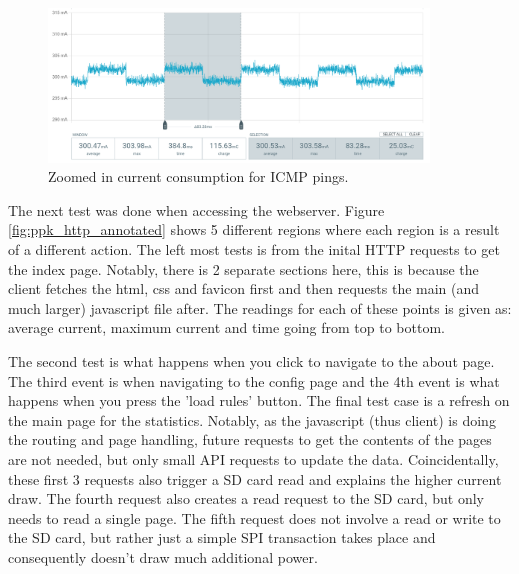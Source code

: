 \begin{figure}[h]
    \centering
    \includegraphics[width=0.9\textwidth]{Images/PPK_ping_zoom.png}
    \caption[Zoomed in current consumption for ICMP pings]{Zoomed in current consumption for ICMP pings.}
    \label{fig:ppk_icmp_ping}
\end{figure}



The next test was done when accessing the webserver. Figure \ref{fig:ppk_http_annotated} shows 5 different regions where each region is a result of a different action. The left most tests is from the inital HTTP requests to get the index page. Notably, there is 2 separate sections here, this is because the client fetches the html, css and favicon first and then requests the main (and much larger) javascript file after. The readings for each of these points is given as: average current, maximum current and time going from top to bottom. 

The second test is what happens when you click to navigate to the about page. The third event is when navigating to the config page and the 4th event is what happens when you press the 'load rules' button. The final test case is a refresh on the main page for the statistics. Notably, as the javascript (thus client) is doing the routing and page handling, future requests to get the contents of the pages are not needed, but only small API requests to update the data. Coincidentally, these first 3 requests also trigger a SD card read and explains the higher current draw. The fourth request also creates a read request to the SD card, but only needs to read a single page. The fifth request does not involve a read or write to the SD card, but rather just a simple SPI transaction takes place and consequently doesn't draw much additional power. 

